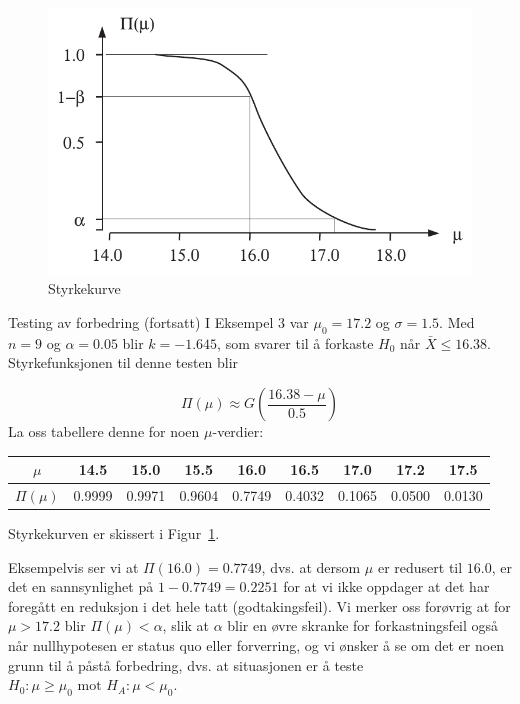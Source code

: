 \begin{figure}[ht]
\centering
  \includegraphics[scale=0.8]{figurer/fig8_2.pdf} 
 \caption{Styrkekurve}
	\label{fig:styrkekurve}
\end{figure}

\addtocounter{eksecount}{-1}
\begin{eksempel}{Testing av forbedring (fortsatt)}
I Eksempel 3 var ${\mu}_0=17.2$ og $\sigma =1.5$. Med $n=9$ og
$\alpha =0.05$ blir $k=-1.645$, som svarer til å forkaste
$H_0$ når $\bar X \le 16.38$. Styrkefunksjonen til denne
testen blir

\[ \Pi (\mu )\approx G(\frac{16.38-\mu}{0.5})   \]
La oss tabellere denne for noen $\mu$-verdier:
\begin{center} \addtolength{\tabcolsep}{-0.3\tabcolsep}
\begin{tabular}{c|cccccccc}
 $\mu$     & 14.5 & 15.0 & 15.5 & 16.0 & 16.5 & 17.0 & 17.2 & 17.5 \\ \hline
 $\Pi (\mu)$ &0.9999&0.9971&0.9604&0.7749&0.4032&0.1065&0.0500&0.0130
\end{tabular}
\end{center}
Styrkekurven er skissert i Figur~\ref{fig:styrkekurve}.

Eksempelvis ser vi at $\Pi (16.0)=0.7749$, dvs. at dersom $\mu$ er
redusert til $16.0$, er det en sannsynlighet på $1-
0.7749=0.2251$ for at vi ikke oppdager at det har foregått en
reduksjon i det hele tatt (godtakingsfeil). Vi merker oss forøvrig
at for $\mu>17.2$ blir $\Pi(\mu)< \alpha$, slik at
$\alpha$ blir en øvre skranke for forkastningsfeil også
når nullhypotesen er status quo eller forverring, og vi
ønsker å se om det er noen grunn til å påstå
forbedring, dvs. at situasjonen er å teste
$H_0:\mu \ge {\mu}_0 \mbox{\ \ mot \ \ } H_A:\mu < {\mu}_0.$
\end{eksempel}\\

